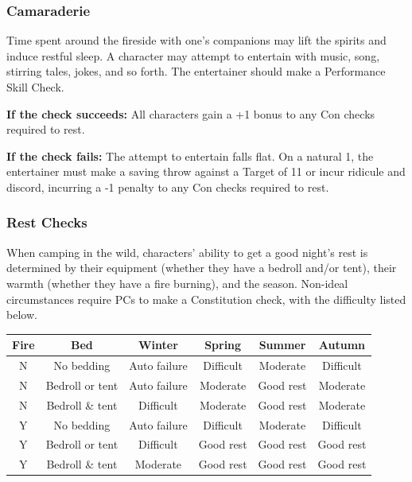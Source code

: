 \documentclass{book}
\begin{document}
\subsubsection*{Camaraderie}\label{camaraderie}

Time spent around the fireside with one's companions may lift the
spirits and induce restful sleep. A character may attempt to entertain
with music, song, stirring tales, jokes, and so forth. The entertainer
should make a Performance Skill Check.

\textbf{If the check succeeds:} All characters gain a +1 bonus to any
Con checks required to rest.

\textbf{If the check fails:} The attempt to entertain falls flat. On a
natural 1, the entertainer must make a saving throw against a Target of
11 or incur ridicule and discord, incurring a -1 penalty to any Con
checks required to rest.

\subsubsection*{Rest Checks}\label{rest-checks}

When camping in the wild, characters' ability to get a good night's rest
is determined by their equipment (whether they have a bedroll and/or
tent), their warmth (whether they have a fire burning), and the season.
Non-ideal circumstances require PCs to make a Constitution check, with
the difficulty listed below.

\begin{table}[ht]
	\centering

		\begin{tabular}{cccccc}
			\toprule
				Fire & Bed & Winter & Spring & Summer & Autumn \\
			\midrule
				N & No bedding & Auto failure & Difficult & Moderate & Difficult \\
				N & Bedroll or tent & Auto failure & Moderate & Good rest & Moderate \\
				N & Bedroll \& tent & Difficult & Moderate & Good rest & Moderate \\
				Y & No bedding & Auto failure & Difficult & Moderate & Difficult \\
				Y & Bedroll or tent & Difficult & Good rest & Good rest & Good rest \\
				Y & Bedroll \& tent & Moderate & Good rest & Good rest & Good rest \\
			\bottomrule
		\end{tabular}

\end{table}
\end{document}
